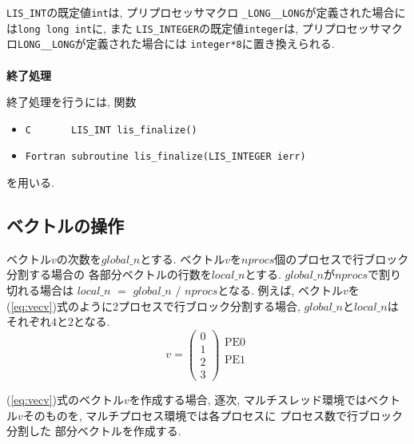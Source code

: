 \documentclass[a4paper]{jarticle}
\begin{document}
{{{\tt LIS\_INT}の既定値{\tt int}は, プリプロセッサマクロ
{\tt \_LONG\_\_LONG}が定義された場合には{\tt long long int}に, また
{\tt LIS\_INTEGER}の既定値{\tt integer}は, 
プリプロセッサマクロ{\tt LONG\_\_LONG}が定義された場合には
{\tt integer*8}に置き換えられる. 
\\ \\
\noindent
{\bf 終了処理}

終了処理を行うには, 関数
\begin{itemize}
\item \verb+C       LIS_INT lis_finalize()+
\item \verb+Fortran subroutine lis_finalize(LIS_INTEGER ierr)+
\end{itemize}
を用いる. 

\subsection{ベクトルの操作}
ベクトル$v$の次数を$global\_n$とする. 
ベクトル$v$を$nprocs$個のプロセスで行ブロック分割する場合の
各部分ベクトルの行数を$local\_n$とする. 
$global\_n$が$nprocs$で割り切れる場合は
$local\_n$ $=$ $global\_n$ $/$ $nprocs$となる. 
例えば, 
ベクトル$v$を(\ref{eq:vecv})式のように2プロセスで行ブロック分割する場合, 
$global\_n$と$local\_n$はそれぞれ$4$と$2$となる. 
\begin{equation}
v = 
\left(
\begin{array}{c}
0 \\
1 \\ \hline
2 \\
3  
\end{array}
\right)
\begin{array}{l}
\mbox{PE0} \\
    \\
\mbox{PE1} \\
   \\ 
\end{array}
\label{eq:vecv}
\end{equation}

(\ref{eq:vecv})式のベクトル$v$を作成する場合, 
逐次, マルチスレッド環境ではベクトル$v$そのものを, マルチプロセス環境では各プロセスに
プロセス数で行ブロック分割した
部分ベクトルを作成する. 

}}
\end{document}
